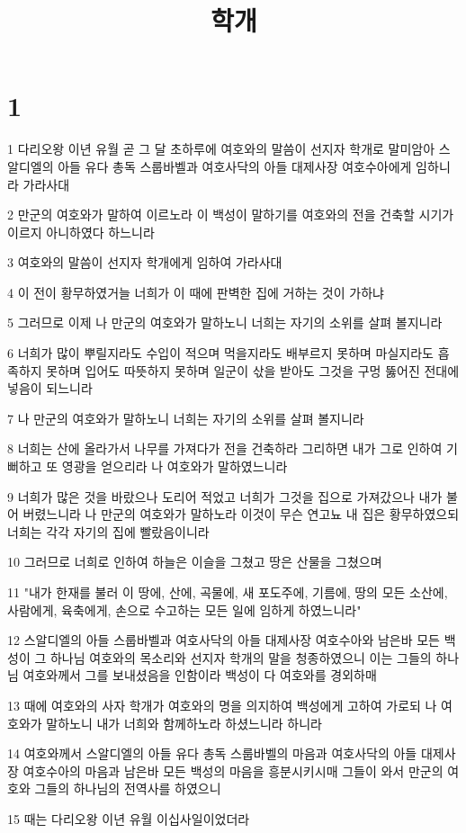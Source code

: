 

\title{학개}


\chapter{1}

\par 1 다리오왕 이년 유월 곧 그 달 초하루에 여호와의 말씀이 선지자 학개로 말미암아 스알디엘의 아들 유다 총독 스룹바벨과 여호사닥의 아들 대제사장 여호수아에게 임하니라 가라사대
\par 2 만군의 여호와가 말하여 이르노라 이 백성이 말하기를 여호와의 전을 건축할 시기가 이르지 아니하였다 하느니라
\par 3 여호와의 말씀이 선지자 학개에게 임하여 가라사대
\par 4 이 전이 황무하였거늘 너희가 이 때에 판벽한 집에 거하는 것이 가하냐
\par 5 그러므로 이제 나 만군의 여호와가 말하노니 너희는 자기의 소위를 살펴 볼지니라
\par 6 너희가 많이 뿌릴지라도 수입이 적으며 먹을지라도 배부르지 못하며 마실지라도 흡족하지 못하며 입어도 따뜻하지 못하며 일군이 삯을 받아도 그것을 구멍 뚫어진 전대에 넣음이 되느니라
\par 7 나 만군의 여호와가 말하노니 너희는 자기의 소위를 살펴 볼지니라
\par 8 너희는 산에 올라가서 나무를 가져다가 전을 건축하라 그리하면 내가 그로 인하여 기뻐하고 또 영광을 얻으리라 나 여호와가 말하였느니라
\par 9 너희가 많은 것을 바랐으나 도리어 적었고 너희가 그것을 집으로 가져갔으나 내가 불어 버렸느니라 나 만군의 여호와가 말하노라 이것이 무슨 연고뇨 내 집은 황무하였으되 너희는 각각 자기의 집에 빨랐음이니라
\par 10 그러므로 너희로 인하여 하늘은 이슬을 그쳤고 땅은 산물을 그쳤으며
\par 11 "내가 한재를 불러 이 땅에, 산에, 곡물에, 새 포도주에, 기름에, 땅의 모든 소산에, 사람에게, 육축에게, 손으로 수고하는 모든 일에 임하게 하였느니라"
\par 12 스알디엘의 아들 스룹바벨과 여호사닥의 아들 대제사장 여호수아와 남은바 모든 백성이 그 하나님 여호와의 목소리와 선지자 학개의 말을 청종하였으니 이는 그들의 하나님 여호와께서 그를 보내셨음을 인함이라 백성이 다 여호와를 경외하매
\par 13 때에 여호와의 사자 학개가 여호와의 명을 의지하여 백성에게 고하여 가로되 나 여호와가 말하노니 내가 너희와 함께하노라 하셨느니라 하니라
\par 14 여호와께서 스알디엘의 아들 유다 총독 스룹바벨의 마음과 여호사닥의 아들 대제사장 여호수아의 마음과 남은바 모든 백성의 마음을 흥분시키시매 그들이 와서 만군의 여호와 그들의 하나님의 전역사를 하였으니
\par 15 때는 다리오왕 이년 유월 이십사일이었더라

